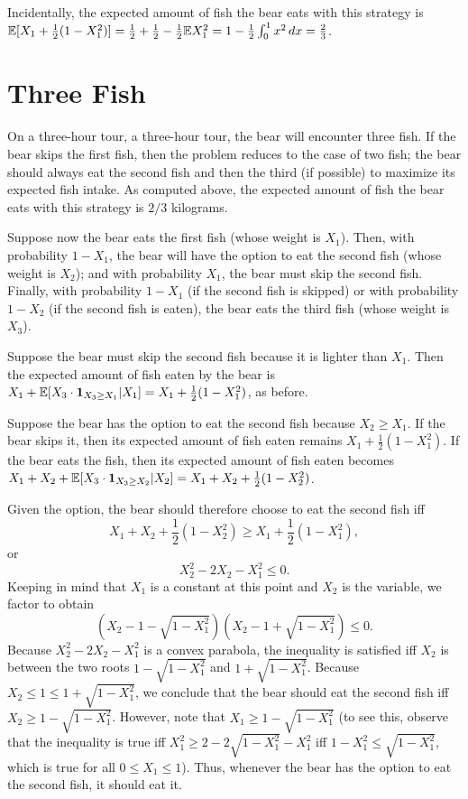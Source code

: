 Incidentally, the expected amount of fish the bear eats with this strategy is $\mathbb{E}[X_1 + \frac{1}{2}(1-X_1^2)] = \frac{1}{2} + \frac{1}{2} - \frac{1}{2}\mathbb{E}{X_1^2} = 1 - \frac{1}{2}\int_0^1 x^2 \,dx = \frac{2}{3}$.

\section{Three Fish}

On a three-hour tour, a three-hour tour, the bear will encounter three fish. If the bear skips the first fish, then the problem reduces to the case of two fish; the bear should always eat the second fish and then the third (if possible) to maximize its expected fish intake. As computed above, the expected amount of fish the bear eats with this strategy is $2/3$ kilograms.

Suppose now the bear eats the first fish (whose weight is $X_1$). Then, with probability $1-X_1$, the bear will have the option to eat the second fish (whose weight is $X_2$); and with probability $X_1$, the bear must skip the second fish. Finally, with probability $1-X_1$ (if the second fish is skipped) or with probability $1-X_2$ (if the second fish is eaten), the bear eats the third fish (whose weight is $X_3$).

Suppose the bear must skip the second fish because it is lighter than $X_1$. Then the expected amount of fish eaten by the bear is $X_1 + \mathbb{E}[X_3 \cdot \mathbf{1}_{X_3 \geq X_1}|X_1] = X_1 + \frac{1}{2}(1-X_1^2)$, as before.

Suppose the bear has the option to eat the second fish because $X_2 \geq X_1$. If the bear skips it, then its expected amount of fish eaten remains $X_1 + \frac{1}{2}(1-X_1^2)$. If the bear eats the fish, then its expected amount of fish eaten becomes $X_1 + X_2 + \mathbb{E}[X_3 \cdot \mathbf{1}_{X_3 \geq X_2}|X_2] = X_1 + X_2 + \frac{1}{2}(1-X_2^2)$.

Given the option, the bear should therefore choose to eat the second fish iff
	\[ X_1 + X_2 + \frac{1}{2}(1-X_2^2) \geq X_1 + \frac{1}{2}(1-X_1^2), \]
or
	\[ X_2^2 - 2X_2 - X_1^2 \leq 0. \]
Keeping in mind that $X_1$ is a constant at this point and $X_2$ is the variable, we factor to obtain
	\[ \left(X_2 - 1 - \sqrt{1-X_1^2}\right) \left(X_2 - 1 + \sqrt{1-X_1^2}\right) \leq 0. \]
Because $X_2^2 - 2X_2 - X_1^2$ is a convex parabola, the inequality is satisfied iff $X_2$ is between the two roots $1 - \sqrt{1-X_1^2}$ and $1 + \sqrt{1-X_1^2}$. Because $X_2 \leq 1 \leq 1 + \sqrt{1-X_1^2}$, we conclude that the bear should eat the second fish iff $X_2 \geq 1 - \sqrt{1-X_1^2}$. However, note that $X_1 \geq 1 - \sqrt{1-X_1^2}$ (to see this, observe that the inequality is true iff $X_1^2 \geq 2 - 2\sqrt{1-X_1^2} - X_1^2$ iff $1 - X_1^2 \leq \sqrt{1-X_1^2}$, which is true for all $0 \leq X_1 \leq 1$). Thus, whenever the bear has the option to eat the second fish, it should eat it.

